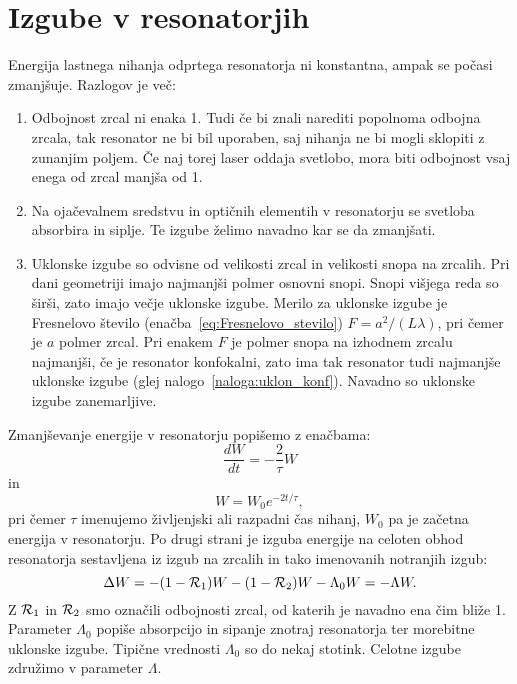 \section{Izgube v resonatorjih}
Energija lastnega nihanja odprtega resonatorja ni konstantna, ampak se počasi
zmanjšuje. Razlogov je več:
\begin{enumerate}
\item Odbojnost zrcal ni enaka 1. Tudi če bi znali narediti popolnoma odbojna zrcala, 
tak resonator ne bi bil uporaben, saj nihanja ne bi mogli sklopiti z zunanjim poljem. Če 
naj torej laser oddaja svetlobo, mora biti odbojnost vsaj enega od zrcal manjša od 1.
\item Na ojačevalnem sredstvu in optičnih elementih v resonatorju se svetloba absorbira in siplje. 
Te izgube želimo navadno kar se da zmanjšati.
\item Uklonske izgube so odvisne od velikosti zrcal in velikosti snopa na zrcalih.
Pri dani geometriji imajo najmanjši polmer osnovni snopi. Snopi višjega
reda so širši, zato imajo večje uklonske izgube. Merilo za uklonske
izgube je Fresnelovo število (enačba~\ref{eq:Fresnelovo_stevilo}) 
$F=a^{2}/(L\lambda)$, pri čemer je $a$ polmer zrcal. Pri enakem $F$ je
polmer snopa na izhodnem zrcalu najmanjši, če je resonator konfokalni, 
zato ima tak resonator tudi najmanjše uklonske izgube (glej nalogo~\ref{naloga:uklon_konf}).
Navadno so uklonske izgube zanemarljive. 
\end{enumerate}

Zmanjševanje energije v resonatorju popišemo z enačbama:
\begin{equation}
\frac{dW}{dt}=-\frac{2}{\tau}W
\label{eq:dW}
\end{equation}
in 
\begin{equation}
W = W_0 e^{-2t/\tau},
\label{eq:dW1}
\end{equation}
pri čemer $\tau$ imenujemo življenjski ali razpadni čas nihanj, 
$W_0$ pa je začetna energija v resonatorju.
Po drugi strani je izguba energije na celoten obhod resonatorja 
sestavljena iz izgub na zrcalih in tako imenovanih notranjih izgub:
\begin{equation}
\Delta W = -(1-{\cal R}_{1})W-(1-{\cal R}_{2})W -\Lambda_{0} W = -\Lambda W.
\label{eq:Lambda}
\end{equation}
Z ${\cal R}_{1}$ in ${\cal R}_{2}$ smo označili odbojnosti zrcal, od katerih je navadno ena
čim bliže 1. Parameter $\Lambda_{0}$ popiše absorpcijo in
sipanje znotraj resonatorja ter morebitne uklonske izgube. Tipične vrednosti 
$\Lambda_0$ so do nekaj stotink. Celotne izgube združimo v parameter $\Lambda$. 

